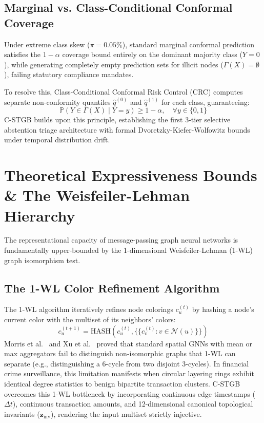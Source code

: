 \subsection{Marginal vs. Class-Conditional Conformal Coverage}
Under extreme class skew ($\pi = 0.05\%$), standard marginal conformal prediction satisfies the $1-\alpha$ coverage bound entirely on the dominant majority class ($Y=0$), while generating completely empty prediction sets for illicit nodes ($\Gamma(X) = \emptyset$), failing statutory compliance mandates.

To resolve this, Class-Conditional Conformal Risk Control (CRC) computes separate non-conformity quantiles $\hat{q}^{(0)}$ and $\hat{q}^{(1)}$ for each class, guaranteeing:
\begin{equation}
\mathbb{P}\left( Y \in \Gamma(X) \mid Y = y \right) \ge 1 - \alpha, \quad \forall y \in \{0, 1\}
\end{equation}
C-STGB builds upon this principle, establishing the first 3-tier selective abstention triage architecture with formal Dvoretzky-Kiefer-Wolfowitz bounds under temporal distribution drift.

\section{Theoretical Expressiveness Bounds \& The Weisfeiler-Lehman Hierarchy}
The representational capacity of message-passing graph neural networks is fundamentally upper-bounded by the 1-dimensional Weisfeiler-Lehman (1-WL) graph isomorphism test.

\subsection{The 1-WL Color Refinement Algorithm}
The 1-WL algorithm iteratively refines node colorings $c_u^{(t)}$ by hashing a node's current color with the multiset of its neighbors' colors:
\begin{equation}
c_u^{(t+1)} = \text{HASH}\left( c_u^{(t)}, \{\{ c_v^{(t)} : v \in \mathcal{N}(u) \}\} \right)
\end{equation}
Morris et al.~\cite{morris2019weisfeiler} and Xu et al.~\cite{xu2019powerful} proved that standard spatial GNNs with mean or max aggregators fail to distinguish non-isomorphic graphs that 1-WL can separate (e.g., distinguishing a 6-cycle from two disjoint 3-cycles). In financial crime surveillance, this limitation manifests when circular layering rings exhibit identical degree statistics to benign bipartite transaction clusters. C-STGB overcomes this 1-WL bottleneck by incorporating continuous edge timestamps ($\Delta t$), continuous transaction amounts, and 12-dimensional canonical topological invariants ($\mathbf{z}_{\text{inv}}$), rendering the input multiset strictly injective.


